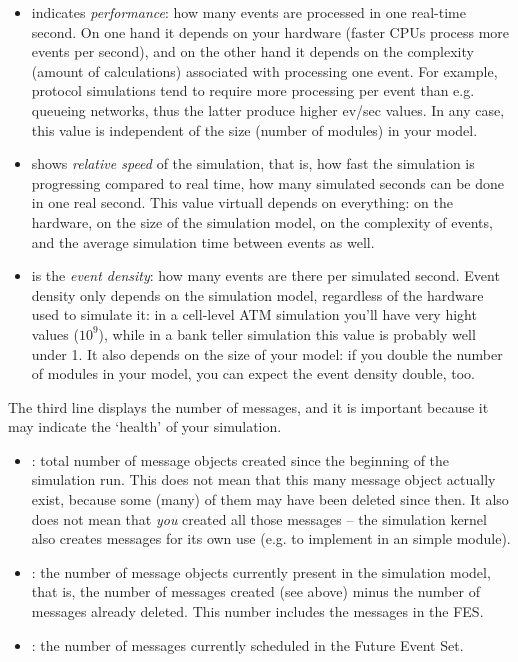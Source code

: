 \begin{itemize}
   \item{ indicates \textit{performance}: how many events are processed
     in one real-time second.  On one hand it depends on your hardware
     (faster CPUs process more events per second), and on the other hand
     it depends on the complexity (amount of calculations) associated
     with processing one event. For example, protocol simulations tend to require
     more processing per event than e.g. queueing networks, thus
     the latter produce higher ev/sec values.
     In any case, this value is independent of the size (number of modules) in your model.}
   \item{ shows \textit{relative speed} of the simulation, that is,
     how fast the simulation is progressing compared to real time, how many
     simulated seconds can be done in one real second. This value virtuall depends
     on everything: on the hardware, on the size of the simulation model,
     on the complexity of events, and the average simulation time between events as well.}
   \item{ is the \textit{event density}: how many events are
     there per simulated second. Event density only depends on the simulation model,
     regardless of the hardware used to simulate it: in a cell-level ATM simulation
     you'll have very hight values ($10^9$), while in a bank teller simulation
     this value is probably well under 1. It also depends on the size of your
     model: if you double the number of modules in your model, you can expect
     the event density double, too.}
\end{itemize}

The third line displays the number of messages, and it is important
because it may indicate the `health' of your simulation.

\begin{itemize}
   \item{: total number of message objects created since the
     beginning of the simulation run. This does not mean that this many message
     object actually exist, because some (many) of them may have been deleted
     since then. It also does not mean that \textit{you} created all those
     messages -- the simulation kernel also creates messages for its own use
     (e.g. to implement  in an  simple module).}
   \item{: the number of message objects currently present
     in the simulation model, that is, the number of messages created (see above)
     minus the number of messages already deleted. This number includes
     the messages in the FES.}
   \item{: the number of messages currently scheduled in the
     Future Event Set.}
\end{itemize}


